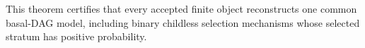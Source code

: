 This theorem certifies that every accepted finite object reconstructs one common basal-DAG model, including binary childless selection mechanisms whose selected stratum has positive probability.